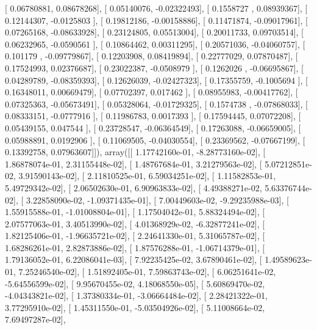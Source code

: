 \documentclass{article}
\begin{document}
       [ 0.06780881,  0.08678268],
       [ 0.05140076, -0.02322493],
       [ 0.1558727 ,  0.08939367],
       [ 0.12144307, -0.0125803 ],
       [ 0.19812186, -0.00158886],
       [ 0.11471874, -0.09017961],
       [ 0.07265168, -0.08633928],
       [ 0.23124805,  0.05513004],
       [ 0.20011733,  0.09703514],
       [ 0.06232965, -0.0590561 ],
       [ 0.10864462,  0.00311295],
       [ 0.20571036, -0.04060757],
       [ 0.101179  , -0.09779867],
       [ 0.12203908,  0.08419894],
       [ 0.22777029,  0.07870487],
       [ 0.17524993,  0.02376687],
       [ 0.23022387, -0.0508979 ],
       [ 0.1262026 , -0.06695867],
       [ 0.04289789, -0.08359393],
       [ 0.12626039, -0.02427323],
       [ 0.17355759, -0.1005694 ],
       [ 0.16348011,  0.00669479],
       [ 0.07702397,  0.017462  ],
       [ 0.08955983, -0.00417762],
       [ 0.07325363, -0.05673491],
       [ 0.05328064, -0.01729325],
       [ 0.1574738 , -0.07868033],
       [ 0.08333151, -0.0777916 ],
       [ 0.11986783,  0.0017393 ],
       [ 0.17594445,  0.07072208],
       [ 0.05439155,  0.047544  ],
       [ 0.23728547, -0.06364549],
       [ 0.17263088, -0.06659005],
       [ 0.05988891,  0.0192906 ],
       [ 0.11069505, -0.04030554],
       [ 0.23369562, -0.07667199],
       [ 0.13392758,  0.07963607]]), array([[  1.17742160e-01,  -8.28773160e-02],
       [  1.86878074e-01,   2.31155448e-02],
       [  1.48767684e-01,   3.21279563e-02],
       [  5.07212851e-02,   3.91590143e-02],
       [  2.11810525e-01,   6.59034251e-02],
       [  1.11582853e-01,   5.49729342e-02],
       [  2.06502630e-01,   6.90963833e-02],
       [  4.49388271e-02,   5.63376744e-02],
       [  3.22858090e-02,  -1.09371435e-01],
       [  7.00449603e-02,  -9.29235988e-03],
       [  1.55915588e-01,  -1.01008804e-01],
       [  1.17504042e-01,   5.88324494e-02],
       [  2.07577063e-01,   3.40513990e-02],
       [  4.01368929e-02,  -6.32877241e-02],
       [  1.82125406e-01,  -1.96635721e-02],
       [  2.24641330e-01,   5.31065787e-02],
       [  1.68286261e-01,   2.82873886e-02],
       [  1.87576288e-01,  -1.06714379e-01],
       [  1.79136052e-01,   6.22086041e-03],
       [  7.92235425e-02,   3.67890461e-02],
       [  1.49589623e-01,   7.25246540e-02],
       [  1.51892405e-01,   7.59863743e-02],
       [  6.06251641e-02,  -5.64556599e-02],
       [  9.95670455e-02,   4.18068550e-05],
       [  5.60869470e-02,  -4.04343821e-02],
       [  1.37380334e-01,  -3.06664484e-02],
       [  2.28421322e-01,   3.77295910e-02],
       [  1.45311550e-01,  -5.03504926e-02],
       [  5.11008664e-02,   7.69497287e-02],
\end{document}
